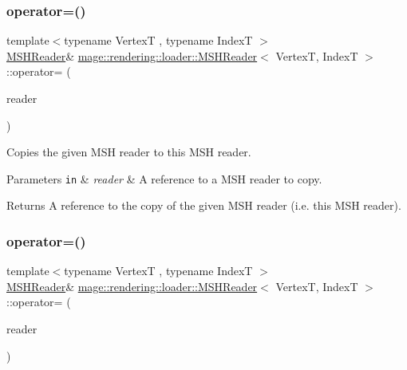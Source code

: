 \subsubsection{\texorpdfstring{operator=()}{operator=()}\hspace{0.1cm}{\footnotesize\ttfamily [1/2]}}
{\footnotesize\ttfamily template$<$typename VertexT , typename IndexT $>$ \\
\mbox{\hyperlink{classmage_1_1rendering_1_1loader_1_1_m_s_h_reader}{M\+S\+H\+Reader}}\& \mbox{\hyperlink{classmage_1_1rendering_1_1loader_1_1_m_s_h_reader}{mage\+::rendering\+::loader\+::\+M\+S\+H\+Reader}}$<$ VertexT, IndexT $>$\+::operator= (\begin{DoxyParamCaption}\item[{const \mbox{\hyperlink{classmage_1_1rendering_1_1loader_1_1_m_s_h_reader}{M\+S\+H\+Reader}}$<$ VertexT, IndexT $>$ \&}]{reader }\end{DoxyParamCaption})\hspace{0.3cm}{\ttfamily [delete]}}

Copies the given M\+SH reader to this M\+SH reader.


\begin{DoxyParams}[1]{Parameters}
\mbox{\tt in}  & {\em reader} & A reference to a M\+SH reader to copy. \\
\hline
\end{DoxyParams}
\begin{DoxyReturn}{Returns}
A reference to the copy of the given M\+SH reader (i.\+e. this M\+SH reader). 
\end{DoxyReturn}
\mbox{\label{classmage_1_1rendering_1_1loader_1_1_m_s_h_reader_a8764164f7e0f78938c5e303d13e0f64d}} 
\subsubsection{\texorpdfstring{operator=()}{operator=()}\hspace{0.1cm}{\footnotesize\ttfamily [2/2]}}
{\footnotesize\ttfamily template$<$typename VertexT , typename IndexT $>$ \\
\mbox{\hyperlink{classmage_1_1rendering_1_1loader_1_1_m_s_h_reader}{M\+S\+H\+Reader}}\& \mbox{\hyperlink{classmage_1_1rendering_1_1loader_1_1_m_s_h_reader}{mage\+::rendering\+::loader\+::\+M\+S\+H\+Reader}}$<$ VertexT, IndexT $>$\+::operator= (\begin{DoxyParamCaption}\item[{\mbox{\hyperlink{classmage_1_1rendering_1_1loader_1_1_m_s_h_reader}{M\+S\+H\+Reader}}$<$ VertexT, IndexT $>$ \&\&}]{reader }\end{DoxyParamCaption})\hspace{0.3cm}{\ttfamily [delete]}}


